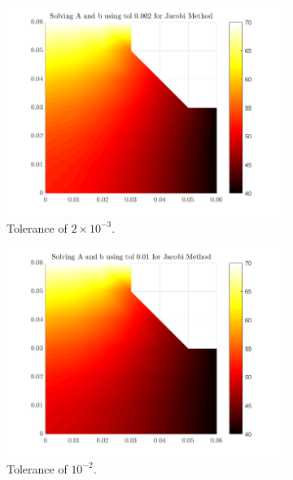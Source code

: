 \documentclass[12pt,a4paper]{article}
\begin{document}
\begin{figure}[H]
\begin{subfigure}[b]{0.48\textwidth}
		\label{fig:Jacobitol0.001}
	\end{subfigure}
	\hfill
	\begin{subfigure}[b]{0.48\textwidth}
		\centering
		\includegraphics[width=\linewidth]{images/JacobiComparisontol0-002.png}
		\caption{Tolerance of $2 \times 10^{-3}$.}
		\label{fig:Jacobitol0.002}
	\end{subfigure}
	\hfill
	\begin{subfigure}[b]{0.48\textwidth}
		\centering
		\includegraphics[width=\linewidth]{images/JacobiComparisontol0-01.png}
		\caption{Tolerance of $10^{-2}$.}
		\label{fig:Jacobitol0.01}
	\end{subfigure}
	\hfill
	\begin{subfigure}[b]{0.48\textwidth}

\end{subfigure}
\end{figure}
\end{document}
